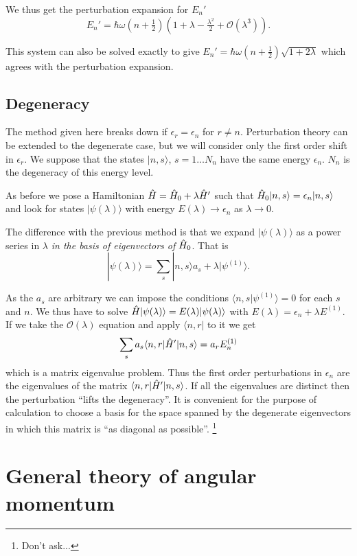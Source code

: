 \documentclass{notes}
\newcommand{\cO}{\mathcal{O}}
\newcommand{\bra}[1]{\langle#1|}
\newcommand{\ket}[1]{|#1\rangle}
\newcommand{\scp}[2]{\langle#1|#2\rangle}
\begin{document}
We thus get the perturbation expansion for $E_n'$
\[
E_n' = \hbar \omega \left( n + \tfrac{1}{2} \right)
\left( 1 + \lambda - \tfrac{\lambda^2}{2} + \cO(\lambda^3)\right).
\]

This system can also be solved exactly to give
$E_n' = \hbar \omega \left( n + \tfrac{1}{2} \right) \sqrt{1 + 2 \lambda}$
which agrees with the perturbation expansion.

\section{Degeneracy}

The method given here breaks down if $\epsilon_r = \epsilon_n$ for
$r \neq n$.  Perturbation theory can be extended to the degenerate case,
but we will consider only the first order shift in $\epsilon_r$.  We
suppose that the states $\ket{n,s}$, $s=1 \dots N_n$ have the same energy
$\epsilon_n$.  $N_n$ is the degeneracy of this energy level.

As before we pose a Hamiltonian $\Hat{H} = \Hat{H}_0
+ \lambda \Hat{H}'$ such that $\Hat{H}_0 \ket{n,s} = \epsilon_n
\ket{n,s}$ and look for states $\ket{\psi(\lambda)}$ with energy
$E(\lambda) \to \epsilon_n$ as $\lambda \to 0$.

The difference with the previous method is that we expand $\ket{\psi(\lambda)}$
as a power series in $\lambda$ \emph{in the basis of eigenvectors of
$\Hat{H}_0$}.  That is
\[
\ket{\psi(\lambda)} = \sum_s \ket{n,s} a_s + \lambda \ket{\psi^{(1)}}.
\]

As the $a_s$ are arbitrary we can impose the conditions
$\scp{n,s}{\psi^{(1)}} = 0$ for each $s$ and $n$.  We thus have to solve
$\Hat{H} \ket{\psi(\lambda)} = E(\lambda) \ket{\psi(\lambda)}$ with
$E(\lambda) = \epsilon_n + \lambda E^{(1)}$.  If we take the $\cO(\lambda)$
equation and apply $\bra{n,r}$ to it we get
\[
\sum_s a_s \bra{n,r} \Hat{H}' \ket{n,s} = a_r E_n^{(1)}
\]
which is a matrix eigenvalue problem.  Thus the first order perturbations
in $\epsilon_n$ are the eigenvalues of
the matrix $\bra{n,r} \Hat{H}' \ket{n,s}$.  If all the eigenvalues are
distinct then the perturbation ``lifts the degeneracy''.  It is
convenient for the purpose of calculation to choose a basis for the space
spanned by the degenerate eigenvectors in which this matrix is
``as diagonal as possible''.%
\footnote{Don't ask...}

\chapter{General theory of angular momentum}
\end{document}
